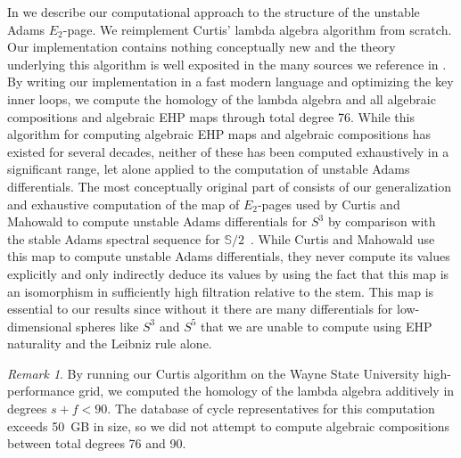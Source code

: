 \documentclass[dvipsnames,table]{amsart}
\theoremstyle{definition}
\theoremstyle{remark}
\newtheorem*{remark*}{Remark}
\numberwithin{equation}{section}
\begin{document}
In  we describe our computational approach to the structure of the unstable Adams $E_2$-page. We reimplement Curtis' lambda algebra algorithm from scratch. Our implementation contains nothing conceptually new and the theory underlying this algorithm is well exposited in the many sources we reference in . By writing our implementation in a fast modern language and optimizing the key inner loops, we compute the homology of the lambda algebra and all algebraic compositions and algebraic EHP maps through total degree 76. While this algorithm for computing algebraic EHP maps and algebraic compositions has existed for several decades, neither of these has been computed exhaustively in a significant range, let alone applied to the computation of unstable Adams differentials. The most conceptually original part of  consists of our generalization and exhaustive computation of the map of $E_2$-pages used by Curtis and Mahowald to compute unstable Adams differentials for $S^3$ by comparison with the stable Adams spectral sequence for $\mathbb{S}/2$~\cite{Curtis_Mahowald_1989}. While Curtis and Mahowald use this map to compute unstable Adams differentials, they never compute its values explicitly and only indirectly deduce its values by using the fact that this map is an isomorphism in sufficiently high filtration relative to the stem. This map is essential to our results since without it there are many differentials for low-dimensional spheres like $S^3$ and $S^5$ that we are unable to compute using EHP naturality and the Leibniz rule alone.
\begin{remark*}
  By running our Curtis algorithm on the Wayne State University high-performance grid, we computed the homology of the lambda algebra additively in degrees $s + f < 90$. The database of cycle representatives for this computation exceeds 50~GB in size, so we did not attempt to compute algebraic compositions between total degrees 76 and 90.
\end{remark*}
\end{document}
